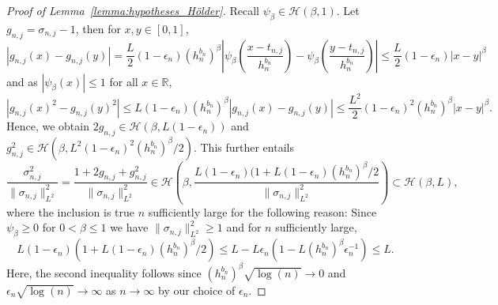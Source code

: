 \documentclass[10.5pt,letter]{article}
\numberwithin{equation}{section}
\theoremstyle{definition}
\newcommand{\R}{\mathbb{R}}
\newcommand{\1}{\mathbbm{1}}
\begin{document}
\begin{proof}[Proof of Lemma~\ref{lemma:hypotheses_Hölder}]
    Recall $\psi_\beta\in\mathcal{H}(\beta,1)$. Let $g_{n,j}=\sigma_{n,j}-1$, then for $x,y\in [0,1]$,
    \[ \left| g_{n,j}(x) - g_{n,j}(y)\right| = \frac{L}{2}(1-\epsilon_n) (h_n^{b_n})^\beta \left| \psi_\beta\left( \frac{x-t_{n,j}}{h_n^{b_n}}\right)- \psi_\beta\left( \frac{y-t_{n,j}}{h_n^{b_n}}\right)\right|  \leq \frac{L}{2} (1-\epsilon_n) |x-y|^\beta\]
    and as $|\psi_\beta(x)|\leq 1$ for all $x\in\R$,
    \[ \left| g_{n,j}(x)^2- g_{n,j}(y)^2\right| \leq L(1-\epsilon_n)(h_n^{b_n})^\beta\left| g_{n,j}(x) - g_{n,j}(y)\right| \leq \frac{L^2}{2}(1-\epsilon_n)^2 (h_n^{b_n})^\beta |x-y|^\beta.  \]
    Hence, we obtain $2g_{n,j}\in\mathcal{H}(\beta,L(1-\epsilon_n))$ and $g_{n,j}^2\in\mathcal{H}(\beta,L^2(1-\epsilon_n)^2(h_n^{b_n})^\beta/2)$. This further entails
    \[ \frac{\sigma_{n,j}^2}{\|\sigma_{n,j}\|_{L^2}^2} = \frac{1+2g_{n,j} + g_{n,j}^2}{\|\sigma_{n,j}\|_{L^2}^2} \in \mathcal{H}\left(\beta, \frac{L(1-\epsilon_n)( 1+L(1-\epsilon_n)(h_n^{b_n})^\beta/2}{\|\sigma_{n,j}\|_{L^2}^2}\right) \subset \mathcal{H}(\beta,L),\]
    where the inclusion is true $n$ sufficiently large for the following reason: Since $\psi_\beta\geq 0$ for $0<\beta\leq 1$ we have $\|\sigma_{n,j}\|_{L^2}^2\geq 1$ and for $n$ sufficiently large,
     \[ L(1-\epsilon_n)\left( 1+L(1-\epsilon_n)(h_n^{b_n})^\beta/2 \right) \leq L- L\epsilon_n \left( 1- L(h_n^{b_n})^\beta\epsilon_n^{-1}\right) \leq L.\]
    Here, the second inequality follows since $(h_n^{b_n})^\beta\sqrt{\log(n)}\rightarrow 0$ and $\epsilon_n\sqrt{\log(n)}\rightarrow \infty$ as $n\to\infty$ by our choice of $\epsilon_n$.
\end{proof}
\end{document}
